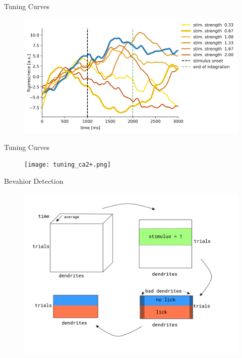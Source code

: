 \documentclass[10pt]{beamer}
\begin{document}
\begin{frame}[fragile]{Tuning Curves}
\begin{center}
	\begin{figure}
      \includegraphics[width=1.0\textwidth]{tuning_ca2+single.png}
	\end{figure}
	\end{center}
\end{frame}

\begin{frame}[fragile]{Tuning Curves}
\begin{center}
	\begin{figure}
      \texttt{[image: tuning\_ca2+.png]}
	\end{figure}
	\end{center}
\end{frame}

\begin{frame}[fragile]{Bevahior Detection}
\begin{center}
	\begin{figure}
      \includegraphics[width=1.0\textwidth]{data_hm.png}
	\end{figure}
	\end{center}
\end{frame}
\end{document}
